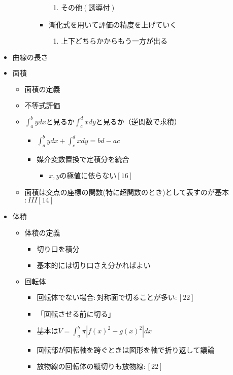 \documentclass[dvipdfmx,uplatex]{jsarticle}
\begin{document}
\begin{itemize}
\begin{itemize}
\begin{itemize}
\begin{itemize}
\begin{enumerate}
					\item $ その他(誘導付)$
				\end{enumerate}
				\item $ 漸化式を用いて評価の精度を上げていく$
				\begin{enumerate}
					\item $ 上下どちらかからもう一方が出る$
				\end{enumerate}
			\end{itemize}
		\end{itemize}
	\end{itemize}
	\item $ 曲線の長さ$
	\item $ 面積$
	\begin{itemize}
		\item $ 面積の定義$
		\item $ 不等式評価$
		\item $ \int^b_a ydx と見るか \int^d_c xdy と見るか（逆関数で求積）$
		\begin{itemize}
			\item $ \int^b_a ydx + \int^d_c xdy = bd - ac$
			\item $ 媒介変数置換で定積分を統合$
			\begin{itemize}
				\item $ x,yの極値に依らない [16]$
			\end{itemize}
		\end{itemize}
		\item 面積は交点の座標の関数(特に超関数のとき)として表すのが基本$:III[14]$
	\end{itemize}
	\item $ 体積$
	\begin{itemize}
		\item $ 体積の定義$
		\begin{itemize}
			\item $ 切り口を積分$
			\item $ 基本的には切り口さえ分かればよい$
		\end{itemize}
		\item $ 回転体$
		\begin{itemize}
			\item $ 回転体でない場合:対称面で切ることが多い:[22]$
			\item $ 「回転させる前に切る」$
			\item $ 基本はV = \int^b_a \pi |f(x)^2 - g(x)^2|dx$
			\item $ 回転部が回転軸を跨ぐときは図形を軸で折り返して議論$
			\item $ 放物線の回転体の縦切りも放物線:[22]$

\end{itemize}
\end{itemize}
\end{itemize}
\end{document}
